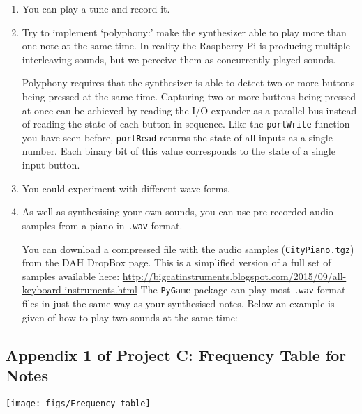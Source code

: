 \begin{enumerate}
\item	You can play a tune and record it.

\item Try to implement `polyphony:' make the synthesizer able to play more than one note at the same time.
In reality the Raspberry Pi is producing multiple interleaving sounds, but we perceive them as concurrently played sounds.

Polyphony requires that the synthesizer is able to detect two or more buttons being pressed at the same time.
Capturing two or more buttons being pressed at once can be achieved by reading the I/O expander as a parallel bus instead of reading the state of each button in sequence.
Like the \texttt{portWrite} function you have seen before, \texttt{portRead} returns the state of all inputs as a single number.
Each binary bit of this value corresponds to the state of a single input button.

\item You could experiment with different wave forms.

\item As well as synthesising your own sounds, you can use pre-recorded audio samples from a piano in \texttt{.wav} format.

You can download a compressed file with the audio samples (\texttt{CityPiano.tgz}) from the DAH DropBox page.
This is a simplified version of a full set of samples available here: \url{http://bigcatinstruments.blogspot.com/2015/09/all-keyboard-instruments.html}
The \texttt{PyGame} package can play most \texttt{.wav} format files in just the same way as your synthesised notes.
Below an example is given of how to play two sounds at the same time:

\newpage

\end{enumerate}



\vfill

\subsection*{Appendix 1 of Project C: Frequency Table for Notes}
\vspace*{-1.0cm}
\begin{center}                                        
 {\texttt{[image: figs/Frequency-table]}}
 \end{center}
 
